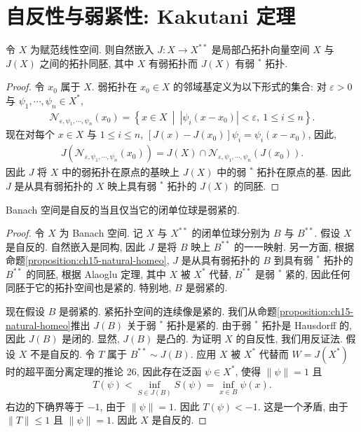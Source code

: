 \documentclass[../../main.tex]{subfiles}
\begin{document}
\section{自反性与弱紧性: Kakutani 定理}\label{section:ch15-kakutani}

\begin{proposition}\label{proposition:ch15-natural-homeo}
令 $X$ 为赋范线性空间. 则自然嵌入 $J:X\to X^{**}$ 是局部凸拓扑向量空间 $X$ 与 $J(X)$ 之间的拓扑同胚, 其中 $X$ 有弱拓扑而 $J(X)$ 有弱 $^{*}$ 拓扑.
\end{proposition}

\begin{proof}
令 $x_{0}$ 属于 $X$. 弱拓扑在 $x_{0}\in X$ 的邻域基定义为以下形式的集合: 对 $\varepsilon>0$ 与 $\psi_{1},\cdots,\psi_{n}\in X^{*}$,
\begin{align*}
\mathcal{N}_{\varepsilon,\psi_{1},\cdots,\psi_{n}}(x_{0})=\left\{x\in X\ \middle|\ \left|\psi_{i}(x-x_{0})\right|<\varepsilon,\ 1\leqslant i\leqslant n\right\}.
\end{align*}
现在对每个 $x\in X$ 与 $1\leqslant i\leqslant n$, $[J(x)-J(x_{0})]\psi_{i}=\psi_{i}(x-x_{0})$, 因此,
\begin{align*}
J(\mathcal{N}_{\varepsilon,\psi_{1},\cdots,\psi_{n}}(x_{0}))=J(X)\cap\mathcal{N}_{\varepsilon,\psi_{1},\cdots,\psi_{n}}(J(x_{0})).
\end{align*}
因此 $J$ 将 $X$ 中的弱拓扑在原点的基映上 $J(X)$ 中的弱 $^{*}$ 拓扑在原点的基. 因此 $J$ 是从具有弱拓扑的 $X$ 映上具有弱 $^{*}$ 拓扑的 $J(X)$ 的同胚.
\end{proof}

\begin{theorem}[Kakutani]\label{theorem:ch15-kakutani}
Banach 空间是自反的当且仅当它的闭单位球是弱紧的.
\end{theorem}

\begin{proof}
令 $X$ 为 Banach 空间. 记 $X$ 与 $X^{**}$ 的闭单位球分别为 $B$ 与 $B^{**}$. 假设 $X$ 是自反的. 自然嵌入是同构, 因此 $J$ 是将 $B$ 映上 $B^{**}$ 的一一映射. 另一方面, 根据命题\cref{proposition:ch15-natural-homeo}, $J$ 是从具有弱拓扑的 $B$ 到具有弱 $^{*}$ 拓扑的 $B^{**}$ 的同胚, 根据 Alaoglu 定理, 其中 $X$ 被 $X^{*}$ 代替, $B^{**}$ 是弱 $^{*}$ 紧的, 因此任何同胚于它的拓扑空间也是紧的. 特别地, $B$ 是弱紧的.

现在假设 $B$ 是弱紧的. 紧拓扑空间的连续像是紧的. 我们从命题\cref{proposition:ch15-natural-homeo}推出 $J(B)$ 关于弱 $^{*}$ 拓扑是紧的. 由于弱 $^{*}$ 拓扑是 Hausdorff 的, 因此 $J(B)$ 是闭的. 显然, $J(B)$ 是凸的. 为证明 $X$ 的自反性, 我们用反证法. 假设 $X$ 不是自反的. 令 $T$ 属于 $B^{**}\sim J(B)$. 应用 $X$ 被 $X^{*}$ 代替而 $W=J(X^{*})$ 时的超平面分离定理的推论 26, 因此存在泛函 $\psi\in X^{*}$, 使得 $\|\psi\|=1$ 且
\begin{align*}
T(\psi)<\inf_{S\in J(B)}S(\psi)=\inf_{x\in B}\psi(x).
\end{align*}
右边的下确界等于 $-1$, 由于 $\|\psi\|=1$. 因此 $T(\psi)<-1$. 这是一个矛盾, 由于 $\|T\|\leqslant 1$ 且 $\|\psi\|=1$. 因此 $X$ 是自反的.
\end{proof}
\end{document}
